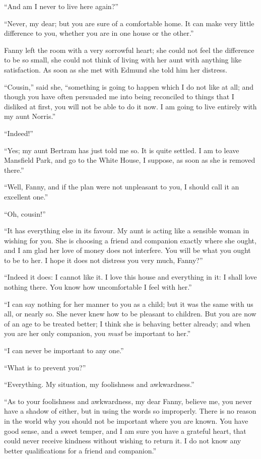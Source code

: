 \documentclass{article}
\begin{document}
``And am I never to live here again?''

``Never, my dear; but you are sure of a comfortable home.
It can make very little difference to you, whether you are
in one house or the other.''

Fanny left the room with a very sorrowful heart; she could
not feel the difference to be so small, she could not think
of living with her aunt with anything like satisfaction.
As soon as she met with Edmund she told him her distress.

``Cousin,'' said she, ``something is going to happen which I
do not like at all; and though you have often persuaded me
into being reconciled to things that I disliked at first,
you will not be able to do it now.  I am going to live
entirely with my aunt Norris.''

``Indeed!''

``Yes; my aunt Bertram has just told me so.  It is quite settled.
I am to leave Mansfield Park, and go to the White House,
I suppose, as soon as she is removed there.''

``Well, Fanny, and if the plan were not unpleasant to you,
I should call it an excellent one.''

``Oh, cousin!''

``It has everything else in its favour.  My aunt is
acting like a sensible woman in wishing for you.  She is
choosing a friend and companion exactly where she ought,
and I am glad her love of money does not interfere.
You will be what you ought to be to her.  I hope it does
not distress you very much, Fanny?''

``Indeed it does:  I cannot like it.  I love this house
and everything in it:  I shall love nothing there.
You know how uncomfortable I feel with her.''

``I can say nothing for her manner to you as a child;
but it was the same with us all, or nearly so.  She never
knew how to be pleasant to children.  But you are now
of an age to be treated better; I think she is behaving
better already; and when you are her only companion,
you \emph{must} be important to her.''

``I can never be important to any one.''

``What is to prevent you?''

``Everything.  My situation, my foolishness and awkwardness.''

``As to your foolishness and awkwardness, my dear Fanny,
believe me, you never have a shadow of either, but in using
the words so improperly.  There is no reason in the world
why you should not be important where you are known.
You have good sense, and a sweet temper, and I am sure you
have a grateful heart, that could never receive kindness
without wishing to return it.  I do not know any better
qualifications for a friend and companion.''
\end{document}
